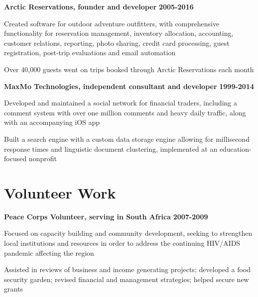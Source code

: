 \textbf{Arctic Reservations, founder and developer} \hfill \textbf{2005-2016}
	
	\begin{list2}
		\item Created software for outdoor adventure outfitters, with comprehensive functionality for reservation management, inventory allocation, accounting, customer relations, reporting, photo sharing, credit card processing, guest registration, post-trip evaluations and email automation
	    \item Over 40,000 guests went on trips booked through Arctic Reservations each month
	\end{list2}

\bigskip

\noindent
\textbf{MaxMo Technologies, independent consultant and developer} \hfill \textbf{1999-2014}
	
	\begin{list2}
		\item Developed and maintained a social network for financial traders, including a comment system with over one million comments and heavy daily traffic, along with an accompanying iOS app
		\item Built a search engine with a custom data storage engine allowing for millisecond response times and linguistic document clustering, implemented at an education-focused nonprofit
	\end{list2}

\section*{Volunteer Work} 
	
\textbf{Peace Corps Volunteer, serving in South Africa} \hfill \textbf{2007-2009}
	
    \begin{list2}
	    \item Focused on capacity building and community development, seeking to strengthen local institutions and resources in order to address the continuing HIV/AIDS pandemic affecting the region
	    \item Assisted in reviews of business and income generating projects; developed a food security garden; revised financial and management strategies; helped secure new grants
    \end{list2}
        
